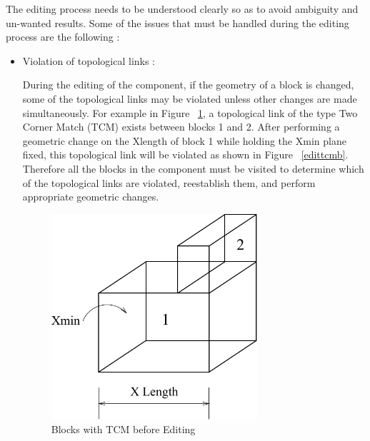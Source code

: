 	The editing process needs to be understood clearly so as to avoid ambiguity
	and un-wanted results. 
	Some of the issues that must be handled during the editing process are the
	following :

	\begin{itemize}
	\item
	Violation of topological links :


	During the editing of the component, if the geometry of a block is changed,
	some of the topological links may be violated unless other changes are made
	simultaneously. For example in Figure ~\ref{edittcma}, a topological link
	of the type Two Corner Match (TCM) exists between blocks 1 and 2. After
	performing a geometric change on the Xlength of block 1 while holding
	the Xmin plane fixed, this topological link will be violated as shown in
	Figure ~\ref{edittcmb}. Therefore all the blocks in the component must
	be visited to determine which of the topological links are violated,
	reestablish them, and perform appropriate geometric changes.
	
        \begin{figure}[htbp]
	\hspace{4cm}
	\includegraphics[width=3.0in,height=3.0in]{IYAD26A.pdf}
	\caption{Blocks with TCM before Editing }
            \label{edittcma}
        \end{figure}
 

\end{itemize}
